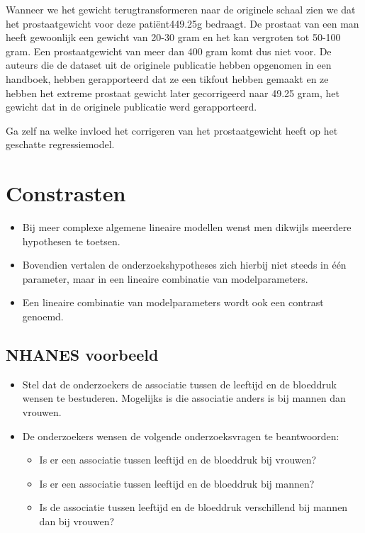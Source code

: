 \documentclass[
  12pt,dutch,coursenotes]{book}
\providecommand{\tightlist}{%
  \setlength{\itemsep}{0pt}\setlength{\parskip}{0pt}}
\begin{document}
Wanneer we het gewicht terugtransformeren naar de originele schaal zien we dat het prostaatgewicht voor deze patiënt449.25g bedraagt. De prostaat van een man heeft gewoonlijk een gewicht van 20-30 gram en het kan vergroten tot 50-100 gram.
Een prostaatgewicht van meer dan 400 gram komt dus niet voor.
De auteurs die de dataset uit de originele publicatie hebben opgenomen in een handboek, hebben gerapporteerd dat ze een tikfout hebben gemaakt en ze hebben het extreme prostaat gewicht later gecorrigeerd naar 49.25 gram, het gewicht dat in de originele publicatie werd gerapporteerd.

Ga zelf na welke invloed het corrigeren van het prostaatgewicht heeft op het geschatte regressiemodel.

\hypertarget{constrasten}{%
\section{Constrasten}\label{constrasten}}

\begin{itemize}
\tightlist
\item
  Bij meer complexe algemene lineaire modellen wenst men dikwijls meerdere hypothesen te toetsen.
\item
  Bovendien vertalen de onderzoekshypotheses zich hierbij niet steeds in één parameter, maar in een lineaire combinatie van modelparameters.
\item
  Een lineaire combinatie van modelparameters wordt ook een contrast genoemd.
\end{itemize}

\hypertarget{nhanes-voorbeeld-1}{%
\subsection{NHANES voorbeeld}\label{nhanes-voorbeeld-1}}

\begin{itemize}
\item
  Stel dat de onderzoekers de associatie tussen de leeftijd en de bloeddruk wensen te bestuderen. Mogelijks is die associatie anders is bij mannen dan vrouwen.
\item
  De onderzoekers wensen de volgende onderzoeksvragen te beantwoorden:

  \begin{itemize}
  \tightlist
  \item
    Is er een associatie tussen leeftijd en de bloeddruk bij vrouwen?
  \item
    Is er een associatie tussen leeftijd en de bloeddruk bij mannen?
  \item
    Is de associatie tussen leeftijd en de bloeddruk verschillend bij mannen dan bij vrouwen?
  \end{itemize}
\end{itemize}
\end{document}
